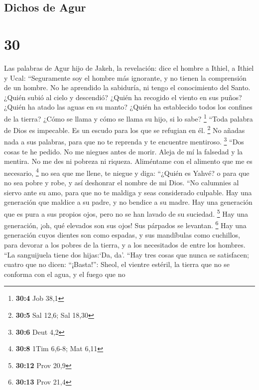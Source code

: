 \hypertarget{dichos-de-agur}{%
\subsection{Dichos de Agur}\label{dichos-de-agur}}

\hypertarget{section-29}{%
\section{30}\label{section-29}}

 Las palabras de Agur hijo de Jakeh, la revelación: dice
el hombre a Ithiel, a Ithiel y Ucal:  ``Seguramente soy el
hombre más ignorante, y no tienen la comprensión de un hombre.
 No he aprendido la sabiduría, ni tengo el conocimiento
del Santo.  ¿Quién subió al cielo y descendió? ¿Quién ha
recogido el viento en sus puños? ¿Quién ha atado las aguas en su manto?
¿Quién ha establecido todos los confines de la tierra? ¿Cómo se llama y
cómo se llama su hijo, si lo sabe? \footnote{\textbf{30:4} Job 38,1}
 ``Toda palabra de Dios es impecable. Es un escudo para
los que se refugian en él. \footnote{\textbf{30:5} Sal 12,6; Sal 18,30}
 No añadas nada a sus palabras, para que no te reprenda y
te encuentre mentiroso. \footnote{\textbf{30:6} Deut 4,2} 
``Dos cosas te he pedido. No me niegues antes de morir. 
Aleja de mí la falsedad y la mentira. No me des ni pobreza ni riqueza.
Aliméntame con el alimento que me es necesario, \footnote{\textbf{30:8}
  1Tim 6,6-8; Mat 6,11}  no sea que me llene, te niegue y
diga: ``¿Quién es Yahvé? o para que no sea pobre y robe, y así deshonrar
el nombre de mi Dios.  ``No calumnies al siervo ante su
amo, para que no te maldiga y seas considerado culpable. 
Hay una generación que maldice a su padre, y no bendice a su madre.
 Hay una generación que es pura a sus propios ojos, pero
no se han lavado de su suciedad. \footnote{\textbf{30:12} Prov 20,9}
 Hay una generación, ¡oh, qué elevados son sus ojos! Sus
párpados se levantan. \footnote{\textbf{30:13} Prov 21,4}
 Hay una generación cuyos dientes son como espadas, y sus
mandíbulas como cuchillos, para devorar a los pobres de la tierra, y a
los necesitados de entre los hombres.  ``La sanguijuela
tiene dos hijas:`Da, da'. ``Hay tres cosas que nunca se satisfacen;
cuatro que no dicen: ``¡Basta!'':  Sheol, el vientre
estéril, la tierra que no se conforma con el agua, y el fuego que no
